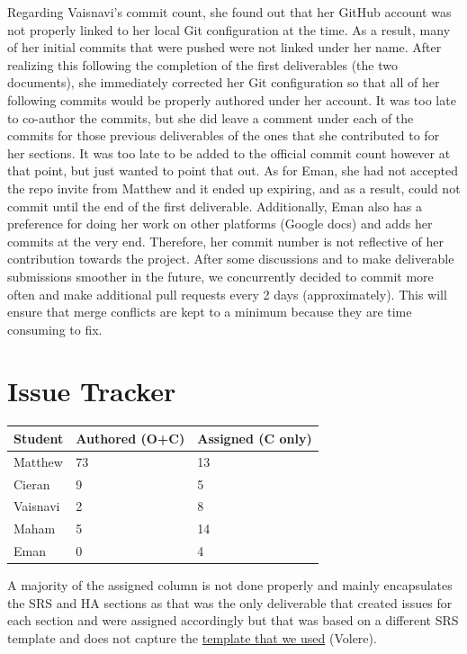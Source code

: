 \documentclass{article}
\begin{document}
Regarding Vaisnavi's commit count, she found out that her GitHub account was not properly linked to her local Git configuration at the time. As a result, many of her initial commits that were pushed were not linked under her name. After realizing this following the completion of the first deliverables (the two documents), she immediately corrected her Git configuration so that all of her following commits would be properly authored under her account. It was too late to co-author the commits, but she did leave a comment under each of the commits for those previous deliverables of the ones that she contributed to for her sections. It was too late to be added to the official commit count however at that point, but just wanted to point that out. As for Eman, she had not accepted the repo invite from Matthew and it ended up expiring, and as a result, could not commit until the end of the first deliverable. Additionally, Eman also has a preference for doing her work on other platforms (Google docs) and adds her commits at the very end. Therefore, her commit number is not reflective of her contribution towards the project. After some discussions and to make deliverable submissions smoother in the future, we concurrently decided to commit more often and make additional pull requests every 2 days (approximately). This will ensure that merge conflicts are kept to a minimum because they are time consuming to fix. 

\section{Issue Tracker}


\begin{table}[H]
\centering
\begin{tabular}{lll}
\toprule
\textbf{Student} & \textbf{Authored (O+C)} & \textbf{Assigned (C only)}\\
\midrule
Matthew & 73 & 13 \\
Cieran & 9 & 5 \\
Vaisnavi & 2 & 8 \\
Maham & 5 & 14 \\
Eman & 0 & 4 \\
\bottomrule
\end{tabular}
\end{table}

A majority of the assigned column is not done properly and mainly encapsulates the SRS and HA sections as that was the only deliverable that created issues for each section and were assigned accordingly but that was based on a different SRS template and does not capture the \href{https://github.com/M9Huynh/technically-functional/blob/main/docs/SRS/SRS.pdf}{template that we used} (Volere).
\end{document}
